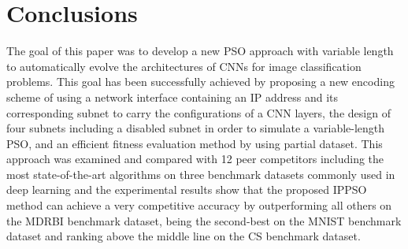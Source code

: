 \documentclass[conference]{IEEEtran}
\begin{document}
%






\section{Conclusions}\label{sec:Conclusion}

The goal of this paper was to develop a new PSO approach with variable length to automatically evolve the architectures of CNNs for image classification problems. This goal has been successfully achieved by proposing a new encoding scheme of using a network interface containing an IP address and its corresponding subnet to carry the configurations of a CNN layers, the design of four subnets including a disabled subnet in order to simulate a variable-length PSO, and an efficient fitness evaluation method by using partial dataset. This approach was examined and compared with 12 peer competitors including the most state-of-the-art algorithms on three benchmark datasets commonly used in deep learning and the experimental results show that the proposed IPPSO method can achieve a very competitive accuracy by outperforming all others on the MDRBI benchmark dataset, being the second-best on the MNIST benchmark dataset and ranking above the middle line on the CS benchmark dataset.
\end{document}
